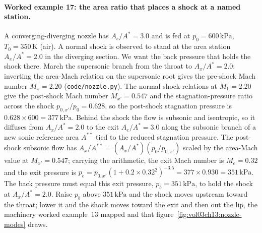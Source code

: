 \paragraph{Worked example 17: the area ratio that places a shock at a
named station.} A converging-diverging nozzle has $A_e/A^* = 3.0$ and
is fed at $p_0 = 600\,\text{kPa}$, $T_0 = 350\,\si{\kelvin}$ (air). A
normal shock is observed to stand at the area station $A_x/A^* = 2.0$ in
the diverging section. We want the back pressure that holds the shock
there. March the supersonic branch from the throat to $A_x/A^* = 2.0$:
inverting the area-Mach relation on the supersonic root gives the
pre-shock Mach number $M_x = 2.20$ (\texttt{code/nozzle.py}). The
normal-shock relations at $M_1 = 2.20$ give the post-shock Mach number
$M_{x'} = 0.547$ and the stagnation-pressure ratio across the shock
$p_{0,x'}/p_0 = 0.628$, so the post-shock stagnation pressure is
$0.628\times 600 = 377\,\text{kPa}$. Behind the shock the flow is
subsonic and isentropic, so it diffuses from $A_x/A^* = 2.0$ to the
exit $A_e/A^* = 3.0$ along the subsonic branch of a new sonic
reference area $A^{**}$ tied to the reduced stagnation pressure. The
post-shock subsonic flow has $A_x/A^{**} = (A_x/A^*)(p_0/p_{0,x'})$
scaled by the area-Mach value at $M_{x'} = 0.547$; carrying the
arithmetic, the exit Mach number is $M_e = 0.32$ and the exit pressure
is $p_e = p_{0,x'}(1 + 0.2\times 0.32^2)^{-3.5} = 377\times 0.930 =
351\,\text{kPa}$. The back pressure must equal this exit pressure,
$p_b = 351\,\text{kPa}$, to hold the shock at $A_x/A^* = 2.0$. Raise
$p_b$ above $351\,\text{kPa}$ and the shock moves upstream toward the
throat; lower it and the shock moves toward the exit and then out the
lip, the machinery worked example~13 mapped and that
figure~\ref{fig:vol03ch13:nozzle-modes} draws.


